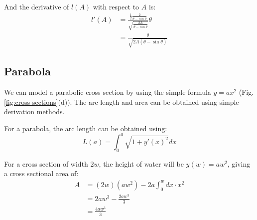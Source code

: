 \documentclass[12pt]{article}
\begin{document}
And the derivative of $l(A)$ with respect to $A$ is:
\begin{equation}
    \begin{split}
         l'(A) &= \frac{\frac{1}{2}\frac{2}{\theta-\sin{\theta}}}{\sqrt{\frac{2A}{\theta-\sin{\theta}}}}\theta
        \\&= \frac{\theta}{\sqrt{2A(\theta-\sin{\theta})}}
    \end{split}
\end{equation}

\subsection{Parabola}
\label{appendix:parabola}
We can model a parabolic cross section by using the simple formula $y = ax^2$ (Fig. \ref{fig:cross-sections}(d)). The arc length and area can be obtained using simple derivation methods.

For a parabola, the arc length can be obtained using:
\begin{equation}
    L(a) = \int_0^a\sqrt{1 + y'(x)^2}dx
\end{equation}

For a cross section of width $2w$, the height of water will be $y(w) = aw^2$, giving a cross sectional area of:
\begin{equation}
    \begin{split}
        A &= (2w)(aw^2) - 2a\int_0^w dx \cdot x^2
        \\ &=2aw^3 - \frac{2aw^3}{3}
        \\ &=\frac{4aw^3}{3}
    \end{split}
\end{equation}
\end{document}
